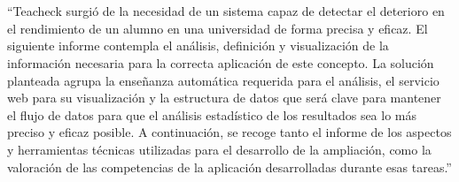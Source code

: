 \chapter*{\abstract}

\setcounter{page}{1}
“Teacheck surgió de la necesidad de un sistema capaz de detectar el deterioro en el rendimiento de un alumno en una universidad de forma precisa y eficaz. El siguiente informe  contempla el análisis, definición y visualización de la información necesaria para la correcta aplicación de este concepto. La solución planteada agrupa la enseñanza automática requerida para el análisis, el servicio web para su visualización y la estructura de datos que será clave para mantener el flujo de datos para que el análisis estadístico de los resultados sea lo más preciso y eficaz posible. A continuación, se recoge tanto el informe de los aspectos y herramientas técnicas utilizadas para el desarrollo de la ampliación, como la valoración de las competencias de la aplicación desarrolladas durante esas tareas.”
	
